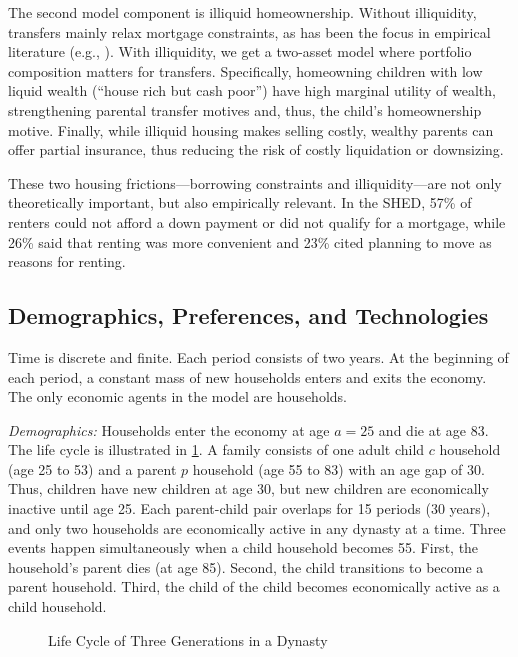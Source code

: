 \documentclass[12pt]{article}
\begin{document}
The second model component is illiquid homeownership. Without illiquidity, transfers mainly relax mortgage constraints, as has been the focus in empirical literature (e.g., \cite{Blickle2019,Engelhardt1998,Guiso2002,Lee2018}). With illiquidity, we get a two-asset model where portfolio composition matters for transfers. Specifically, homeowning children with low liquid wealth (``house rich but cash poor'') have high marginal utility of wealth, strengthening parental transfer motives and, thus, the child's homeownership motive. Finally, while illiquid housing makes selling costly, wealthy parents can offer partial insurance, thus reducing the risk of costly liquidation or downsizing.

These two housing frictions---borrowing constraints and illiquidity---are not only theoretically important, but also empirically relevant. In the SHED, 57\% of renters could not afford a down payment or did not qualify for a mortgage, while 26\% said that renting was more convenient and 23\% cited planning to move as reasons for renting. 

\subsection{Demographics, Preferences, and Technologies}
Time is discrete and finite. Each period consists of two years. At the beginning of each period, a constant mass of new households enters and exits the economy. The only economic agents in the model are households.

\textit{Demographics:} Households enter the economy at age $a=25$ and die at age 83. The life cycle is illustrated in \ref{fig:overview}. A family consists of one adult child $c$ household (age 25 to 53) and a parent $p$ household (age 55 to 83) with an age gap of 30. Thus, children have new children at age 30, but new children are economically inactive until age 25. Each parent-child pair overlaps for 15 periods (30 years), and only two households are economically active in any dynasty at a time. Three events happen simultaneously when a child household becomes 55. First, the household's parent dies (at age 85). Second, the child transitions to become a parent household. Third, the child of the child becomes economically active as a child household.

\begin{figure}\begin{center}
	\caption{Life Cycle of Three Generations in a Dynasty }\label{fig:overview}
	
\end{center}
\end{figure} 
\end{document}
